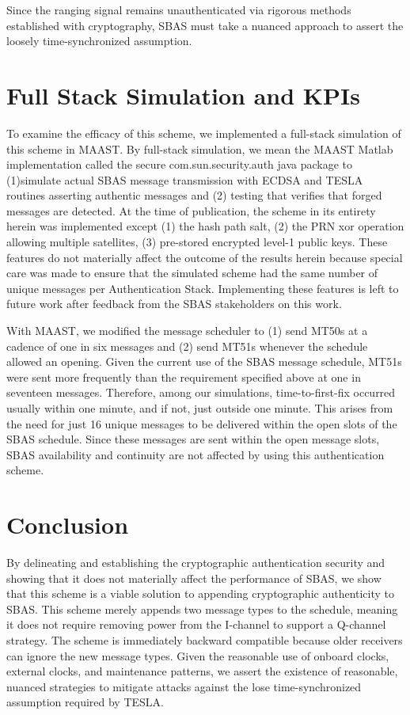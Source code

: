 \documentclass[letterpaper,times]{IONconf/IONconf}
\begin{document}
Since the ranging signal remains unauthenticated via rigorous methods established with cryptography, SBAS must take a nuanced approach to assert the loosely time-synchronized assumption.

\section{Full Stack Simulation and KPIs} \label{sec: experiment}

To examine the efficacy of this scheme, we implemented a full-stack simulation of this scheme in MAAST.
By full-stack simulation, we mean the MAAST Matlab implementation called the secure com.sun.security.auth java package to (1)simulate actual SBAS message transmission with ECDSA and TESLA routines asserting authentic messages and (2) testing that verifies that forged messages are detected.
At the time of publication, the scheme in its entirety herein was implemented except (1) the hash path salt, (2) the PRN xor operation allowing multiple satellites, (3) pre-stored encrypted level-1 public keys.
These features do not materially affect the outcome of the results herein because special care was made to ensure that the simulated scheme had the same number of unique messages per Authentication Stack.
Implementing these features is left to future work after feedback from the SBAS stakeholders on this work.

With MAAST, we modified the message scheduler to (1) send MT50s at a cadence of one in six messages and (2) send MT51s whenever the schedule allowed an opening.
Given the current use of the SBAS message schedule, MT51s were sent more frequently than the requirement specified above at one in seventeen messages.
Therefore, among our simulations, time-to-first-fix occurred usually within one minute, and if not, just outside one minute.
This arises from the need for just 16 unique messages to be delivered within the open slots of the SBAS schedule.
Since these messages are sent within the open message slots, SBAS availability and continuity are not affected by using this authentication scheme.

\section{Conclusion}

By delineating and establishing the cryptographic authentication security and showing that it does not materially affect the performance of SBAS, we show that this scheme is a viable solution to appending cryptographic authenticity to SBAS.
This scheme merely appends two message types to the schedule, meaning it does not require removing power from the I-channel to support a Q-channel strategy.
The scheme is immediately backward compatible because older receivers can ignore the new message types.
Given the reasonable use of onboard clocks, external clocks, and maintenance patterns, we assert the existence of reasonable, nuanced strategies to mitigate attacks against the lose time-synchronized assumption required by TESLA.
\end{document}
